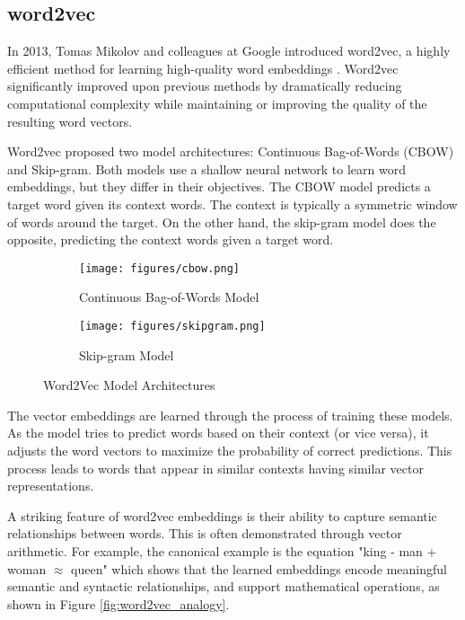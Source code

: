 \documentclass[a4paper, oneside]{discothesis}
\begin{document}
\subsection{word2vec}
In 2013, Tomas Mikolov and colleagues at Google introduced word2vec, a highly efficient method for learning high-quality word embeddings \cite{mikolov2013efficient}. Word2vec significantly improved upon previous methods by dramatically reducing computational complexity while maintaining or improving the quality of the resulting word vectors.

Word2vec proposed two model architectures: Continuous Bag-of-Words (CBOW) and Skip-gram. Both models use a shallow neural network to learn word embeddings, but they differ in their objectives. 
The CBOW model predicts a target word given its context words. The context is typically a symmetric window of words around the target.
On the other hand, the skip-gram model does the opposite, predicting the context words given a target word.
\begin{figure}[h]
    \centering
    \begin{subfigure}[b]{0.45\textwidth}
        \centering
        \texttt{[image: figures/cbow.png]}
        \caption{Continuous Bag-of-Words Model}
        \label{fig:cbow}
    \end{subfigure}
    \hfill
    \begin{subfigure}[b]{0.45\textwidth}
        \centering
        \texttt{[image: figures/skipgram.png]}
        \caption{Skip-gram Model}
        \label{fig:skipgram}
    \end{subfigure}
    \caption{Word2Vec Model Architectures}
    \label{fig:word2vec}
\end{figure}

The vector embeddings are learned through the process of training these models. As the model tries to predict words based on their context (or vice versa), it adjusts the word vectors to maximize the probability of correct predictions. This process leads to words that appear in similar contexts having similar vector representations.

A striking feature of word2vec embeddings is their ability to capture semantic relationships between words. This is often demonstrated through vector arithmetic. For example, the canonical example is the equation "king - man + woman $\approx$ queen" which shows that the learned embeddings encode meaningful semantic and syntactic relationships, and support mathematical operations, as shown in Figure \ref{fig:word2vec_analogy}.
\end{document}
